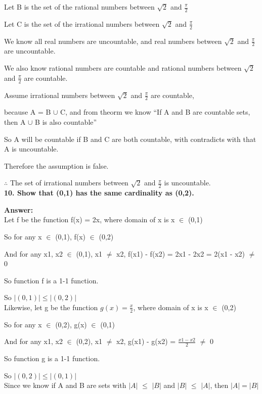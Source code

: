\documentclass{article}
\begin{document}
\begin{large}
Let B is the set of the rational numbers between $\sqrt{2}$ and $\frac{\pi}{2}$

Let C is the set of the irrational numbers between $\sqrt{2}$ and $\frac{\pi}{2}$

We know all real numbers are uncountable, and real numbers between $\sqrt{2}$ and $\frac{\pi}{2}$ are uncountable.

We also know rational numbers are countable and rational numbers between $\sqrt{2}$ and $\frac{\pi}{2}$ are countable.

Assume irrational numbers between $\sqrt{2}$ and $\frac{\pi}{2}$ are countable, 

because A = B $\cup$ C, and from theorm we know ``If A and B are countable sets, then A $\cup$ B is also countable''

So A will be countable if B and C are both countable, with contradicts with that A is uncountable.

Therefore the assumption is false. 

$\therefore$ The set of irrational numbers between $\sqrt{2}$ and $\frac{\pi}{2}$ is uncountable.\\


\textbf{10. Show that (0,1) has the same cardinality as (0,2).}

\textbf{Answer:} \\

Let f be the function f(x) = 2x, where domain of x is x $\in$ (0,1)

So for any x $\in$ (0,1), f(x) $\in$ (0,2)

And for any x1, x2 $\in$ (0,1), x1 $\neq$ x2, f(x1) - f(x2) = 2x1 - 2x2 = 2(x1 - x2) $\neq$ 0

So function f is a 1-1 function.

So $|(0,1)| \le |(0,2)| $\\

Likewise, let g be the function $g(x) = \frac{x}{2}$, where domain of x is x $\in$ (0,2)

So for any x $\in$ (0,2), g(x) $\in$ (0,1)

And for any x1, x2 $\in$ (0,2), x1 $\neq$ x2, g(x1) - g(x2) = $\frac{x1 - x2}{2}$ $\neq$ 0

So function g is a 1-1 function.

So $|(0,2)| \le |(0,1)|$\\

Since we know if A and B are sets with $|A|$ $\le$ $|B|$ and $|B|$ $\le$ $|A|$, then $|A| = |B|$


\end{large}
\end{document}
